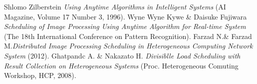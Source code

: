 \documentclass[twocolumn]{article}
\begin{document}
\begin{thebibliography}{unsrt}
    Shlomo Zilberstein \emph{Using Anytime Algorithms in Intelligent Systems} (AI Magazine, Volume 17 Number 3, 1996).
    Wyne Wyne Kywe \& Daisuke Fujiwara \emph{Scheduling of Image Processing Using Anytime Algorithm for Real-time
System} (The 18th International Conference on Pattern Recognition).
    Farzad N.\&  Farzad M.\emph{Distributed Image Processing Scheduling in Heterogeneous Computing Network System} (2012).
    Ghatpandc A. \& Nakazato H. \emph{Divisiblle Load Scheduling with Result Collection on Heterogeneous Systems} (Proc. Heterogeneous Comuting Workshop, HCP, 2008).

\end{thebibliography}
\end{document}
